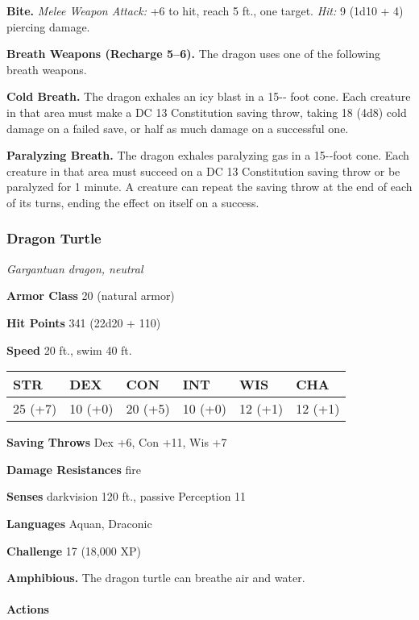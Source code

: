 \documentclass[
]{article}
\begin{document}
\textbf{Bite.} \emph{Melee Weapon Attack:} +6 to hit, reach 5 ft., one
target. \emph{Hit:} 9 (1d10 + 4) piercing damage.

\textbf{Breath Weapons (Recharge 5--6).} The dragon uses one of the
following breath weapons.

\textbf{Cold Breath.} The dragon exhales an icy blast in a 15-­‐ foot
cone. Each creature in that area must make a DC 13 Constitution saving
throw, taking 18 (4d8) cold damage on a failed save, or half as much
damage on a successful one.

\textbf{Paralyzing Breath.} The dragon exhales paralyzing gas in a
15-­‐foot cone. Each creature in that area must succeed on a DC 13
Constitution saving throw or be paralyzed for 1 minute. A creature can
repeat the saving throw at the end of each of its turns, ending the
effect on itself on a success.

\hypertarget{dragon-turtle}{%
\subsubsection{Dragon Turtle}\label{dragon-turtle}}

\emph{Gargantuan dragon, neutral}

\textbf{Armor Class} 20 (natural armor)

\textbf{Hit Points} 341 (22d20 + 110)

\textbf{Speed} 20 ft., swim 40 ft.

\begin{longtable}[]{@{}llllll@{}}
\toprule
STR & DEX & CON & INT & WIS & CHA\tabularnewline
\midrule
\endhead
25 (+7) & 10 (+0) & 20 (+5) & 10 (+0) & 12 (+1) & 12 (+1)\tabularnewline
\bottomrule
\end{longtable}

\textbf{Saving Throws} Dex +6, Con +11, Wis +7

\textbf{Damage Resistances} fire

\textbf{Senses} darkvision 120 ft., passive Perception 11

\textbf{Languages} Aquan, Draconic

\textbf{Challenge} 17 (18,000 XP)

\textbf{Amphibious.} The dragon turtle can breathe air and water.

\hypertarget{actions-63}{%
\paragraph{Actions}\label{actions-63}}
\end{document}
